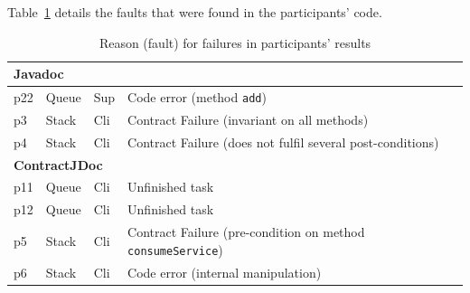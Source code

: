 Table~\ref{tab:faults} details the faults that were found in the participants' code.

\begin{table}
\centering
\caption{Reason (fault) for failures in participants' results}
\label{tab:faults}
\begin{adjustbox}{width=\textwidth}
\begin{tabular}{|l|l|l|l|} 
\hline
\multicolumn{4}{|l|}{\textbf{Javadoc} }                                                                                                                                                                         \\ 
\hline
p22                                        & Queue                             & Sup                                & Code error (method \texttt{add})                                         \\ 
\hline
p3                                         & Stack                             & Cli                                & Contract Failure (invariant on all methods)                                               \\ 
\hline
p4                                         & Stack                             & Cli                                & Contract Failure (does not fulfil several post-conditions)                                \\ 
\hline
\multicolumn{4}{|l|}{\textbf{ContractJDoc }}                                                                                                                                                                    \\ 
\hline
p11                                        & Queue                             & Cli                                & Unfinished task                                                                           \\ 
\hline
p12                                        & Queue                             & Cli                                & Unfinished task                                                                           \\ 
\hline
p5                                         & Stack                             & Cli                                & Contract Failure (pre-condition on method \texttt{consumeService})       \\ 
\hline
p6                                         & Stack                             & Cli                                & Code error (internal manipulation)                                                        \\ 

\end{tabular}
\end{adjustbox}
\end{table}
